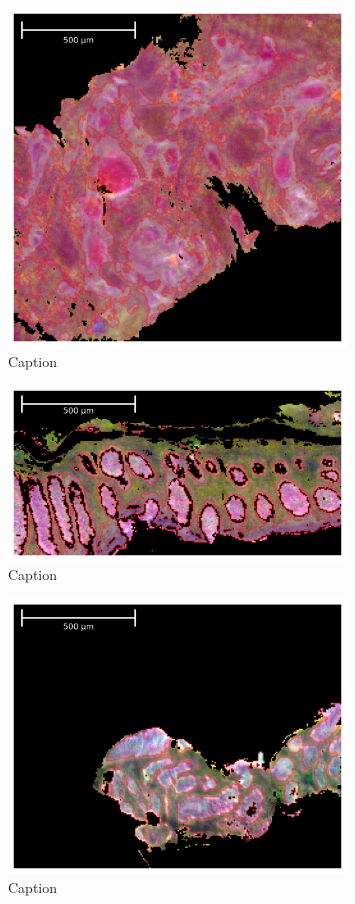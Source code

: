 \begin{figure}[htbp] 
    \centering 
    \includegraphics[width=0.8\textwidth]{Images/sample_17_False_IR.png} 
    \caption{Caption} \label{fig:my-label}
\end{figure}

\begin{figure}[htbp] 
    \centering 
    \includegraphics[width=0.8\textwidth]{Images/sample_20_False_IR.png} 
    \caption{Caption} \label{fig:my-label} 
\end{figure}

\begin{figure}[htbp] 
    \centering 
    \includegraphics[width=0.8\textwidth]{Images/sample_35_False_IR.png} 
    \caption{Caption} \label{fig:my-label} 
\end{figure}

